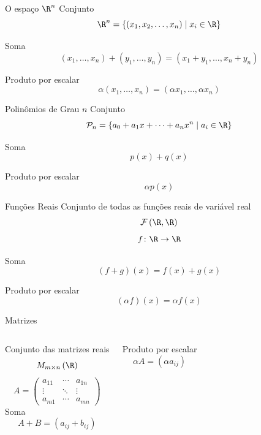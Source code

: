 \documentclass[fleqn,aspectratio=169,12pt]{beamer}
\begin{document}
\begin{frame}{O espaço $\R^n$}
  Conjunto
  \[
    \R^n = \left\{ (x_1, x_2, \ldots, x_n) \mid x_i\in\R \right\}
  \]

  \pause
  Soma
  \[
    (x_1, \ldots, x_n) + (y_1, \ldots, y_n) = (x_1 + y_1, \ldots, x_n + y_n)
  \]

  \pause
  Produto por escalar
  \[
    \alpha(x_1, \ldots, x_n) = (\alpha x_1, \ldots, \alpha x_n)
  \]
\end{frame}

\begin{frame}{Polinômios de Grau $n$}
  Conjunto
  \[
    \mathcal{P}_n = \left\{ a_0 + a_1x + \cdots + a_nx^n \mid a_i\in\R \right\}
  \]

  \pause
  Soma
  \[
    p(x) + q(x)
  \]

  \pause
  Produto por escalar
  \[
    \alpha p(x)
  \]
\end{frame}

\begin{frame}{Funções Reais}
  Conjunto de todas as funções reais de variável real
  \[
    \mathcal{F}\left(\R, \R\right)
  \]
  \[
    f\colon \R \to \R
  \]

  \pause
  Soma
  \[
    (f+g)(x) = f(x) + g(x)
  \]

  \pause
  Produto por escalar
  \[
    (\alpha f)(x) = \alpha f(x)
  \]
\end{frame}

\begin{frame}{Matrizes}
\begin{columns}
  Conjunto das matrizes reais
  \[
    M_{m\times n}\left(\R\right)
  \]
  \pause
  \[
    A =
    \begin{pmatrix}
      a_{11} & \cdots & a_{1n} \\
      \vdots & \ddots & \vdots \\
      a_{m1} & \cdots & a_{mn}
    \end{pmatrix}
  \]
  \pause
  Soma
  \[
    A + B
    = \left( a_{ij} + b_{ij} \right)
  \]

  \pause
  Produto por escalar
  \[
    \alpha A = \left(\alpha a_{ij}\right)
  \]
\end{columns}
\end{frame}
\end{document}
